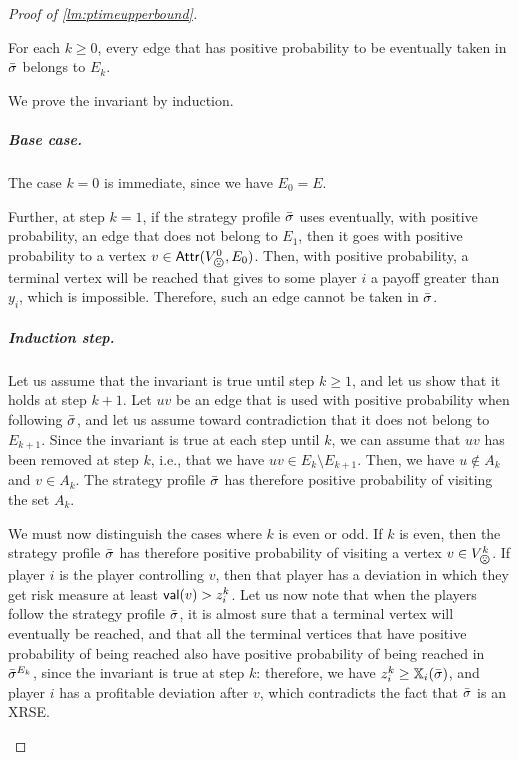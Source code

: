 \begin{proof}[Proof of \cref{lm:ptimeupperbound}]
\begin{claimproof}
        \begin{invariant} \label{inv:edgesnotused_bis}
            For each $k \geq 0$, every edge that has positive probability to be eventually taken in ${\bar{\sigma}}$ belongs to $E_k$.
        \end{invariant}

        \begin{claimproof}
        We prove the invariant by induction. 
        
        \subparagraph*{Base case.} The case $k=0$ is immediate, since we have $E_0 = E$.
        
        Further, at step $k=1$, if the strategy profile ${\bar{\sigma}}$ uses eventually, with positive probability, an edge that does not belong to $E_1$, then it goes with positive probability to a vertex $v \in \Attr(V^0_\bad, E_0)$.
        Then, with positive probability, a terminal vertex will be reached that gives to some player $i$ a payoff greater than $y_i$, which is impossible.
        Therefore, such an edge cannot be taken in ${\bar{\sigma}}$.
        
        
        \subparagraph*{Induction step.} Let us assume that the invariant is true until step $k \geq 1$, and let us show that it holds at step $k+1$.    
        Let $uv$ be an edge that is used with positive probability when following ${\bar{\sigma}}$, and let us assume toward contradiction that it does not belong to $E_{k+1}$.
        Since the invariant is true at each step until $k$, we can assume that $uv$ has been removed at step $k$, i.e., that we have $uv \in E_k \setminus E_{k+1}$.
        Then, we have $u \not\in A_k$ and $v \in A_k$.
        The strategy profile ${\bar{\sigma}}$ has therefore positive probability of visiting the set $A_k$.
        
        We must now distinguish the cases where $k$ is even or odd.
        If $k$ is even, then the strategy profile ${\bar{\sigma}}$ has therefore positive probability of visiting a vertex $v \in V_\bad^k$.
        If player $i$ is the player controlling $v$, then that player has a deviation in which they get risk measure at least $\mathsf{val}(v) > z_i^k$.
        Let us now note that when the players follow the strategy profile ${\bar{\sigma}}$, it is almost sure that a terminal vertex will eventually be reached, and that all the terminal vertices that have positive probability of being reached also have positive probability of being reached in ${\bar{\sigma}}^{E_k}$, since the invariant is true at step $k$: therefore, we have $z_i^k \geq \mathbb{X}_i({\bar{\sigma}})$, and player $i$ has a profitable deviation after $v$, which contradicts the fact that ${\bar{\sigma}}$ is an XRSE.


\end{claimproof}
\end{claimproof}
\end{proof}

